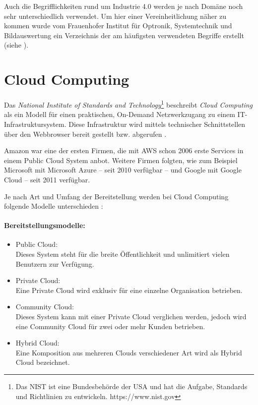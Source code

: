 Auch die Begrifflichkeiten rund um Industrie 4.0 werden je nach Domäne noch sehr unterschiedlich verwendet. Um hier einer Vereinheitlichung näher zu kommen wurde vom Frauenhofer Institut für Optronik, Systemtechnik und Bildauswertung ein Verzeichnis der am häufigsten verwendeten Begriffe erstellt (siehe \parencite{FrauenhoferI40}).

\section{Cloud Computing}
Das \textit{National Institute of Standards and Technology}\footnote{Das \ac{NIST} ist eine Bundesbehörde der USA und hat die Aufgabe, Standards und Richtlinien zu entwickeln. https://www.nist.gov} beschreibt \textit{Cloud Computing} als ein Modell für einen praktischen, On-Demand Netzwerkzugang zu einem IT-In\-fra\-struk\-tur\-sys\-tem. Diese Infrastruktur wird mittels technischer Schnittstellen über den Webbrowser bereit gestellt bzw. abgerufen \parencite{jansen2011sp}.

Amazon war eine der ersten Firmen, die mit \acl{AWS} schon 2006 erste Services in einem Public Cloud System anbot. Weitere Firmen folgten, wie zum Beispiel Microsoft mit Microsoft Azure -- seit 2010 verfügbar -- und Google mit Google Cloud -- seit 2011 verfügbar.

Je nach Art und Umfang der Bereitstellung werden bei Cloud Computing folgende Modelle unterschieden \parencite{jansen2011sp}:

\paragraph{Bereitstellungsmodelle:}
\begin{itemize}
\item Public Cloud:\\ 
Dieses System steht für die breite Öffentlichkeit und unlimitiert vielen Benutzern zur Verfügung.
\item Private Cloud:\\ 
Eine Private Cloud wird exklusiv für eine einzelne Organisation betrieben.
\item Community Cloud:\\ 
Dieses System kann mit einer Private Cloud verglichen werden, jedoch wird eine Community Cloud für zwei oder mehr Kunden betrieben.
\item Hybrid Cloud:\\
Eine Komposition aus mehreren Clouds verschiedener Art wird als Hybrid Cloud bezeichnet.
\end{itemize}

